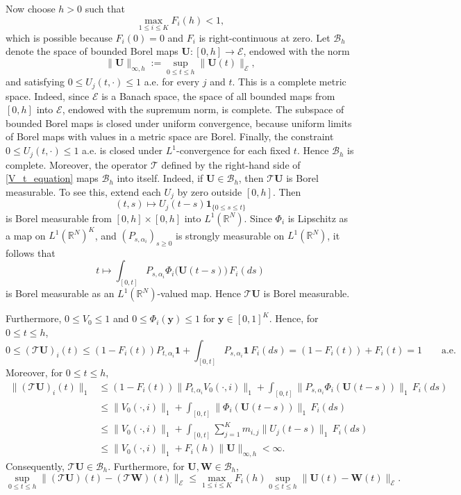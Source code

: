 \documentclass[reqno,final,11pt]{amsart}
\newcommand{\1}{\mathbbm{1}}
\theoremstyle{plain}
\theoremstyle{definition}
\theoremstyle{remark}
\begin{document}
Now choose \(h>0\) such that
\[
\max_{1\le i\le K}F_i(h)<1,
\]
which is possible because \(F_i(0)=0\) and \(F_i\) is right-continuous at
zero. Let \(\mathcal B_h\) denote the space of bounded Borel maps
\(\mathbf U:[0,h]\to\mathcal E\), endowed with the norm
\[
\|\mathbf U\|_{\infty,h}
:=
\sup_{0\le t\le h}\|\mathbf U(t)\|_{\mathcal E},
\]
and satisfying \(0\le U_j(t,\cdot)\le1\) a.e. for every \(j\) and \(t\).
This is a complete metric space. Indeed, since \(\mathcal E\) is a Banach
space, the space of all bounded maps from \([0,h]\) into \(\mathcal E\),
endowed with the supremum norm, is complete. The subspace of bounded Borel
maps is closed under uniform convergence, because uniform limits of Borel maps
with values in a metric space are Borel. Finally, the constraint
\(0\le U_j(t,\cdot)\le1\) a.e. is closed under \(L^1\)-convergence for each
fixed \(t\). Hence \(\mathcal B_h\) is complete. Moreover, the operator \(\mathcal T\) defined by the right-hand side of
\eqref{V_t_equation} maps \(\mathcal B_h\) into itself. Indeed, if
\(\mathbf U\in\mathcal B_h\), then \(\mathcal T\mathbf U\) is Borel
measurable. To see this, extend each \(U_j\) by zero outside \([0,h]\). Then
\[
(t,s)\mapsto U_j(t-s)\mathbf 1_{\{0\le s\le t\}}
\]
is Borel measurable from \([0,h]\times[0,h]\) into \(L^1(\mathbb R^N)\).
Since \(\Phi_i\) is Lipschitz as a map on \(L^1(\mathbb R^N)^K\), and
\((P_{s,\alpha_i})_{s\ge0}\) is strongly measurable on \(L^1(\mathbb R^N)\),
it follows that
\[
t\mapsto
\int_{[0,t]}
P_{s,\alpha_i}\Phi_i\bigl(\mathbf U(t-s)\bigr)\,F_i(ds)
\]
is Borel measurable as an \(L^1(\mathbb R^N)\)-valued map. Hence
\(\mathcal T\mathbf U\) is Borel measurable.

Furthermore, \(0\le V_0\le1\) and \(0\le \Phi_i(\mathbf y)\le1\) for
\(\mathbf y\in[0,1]^K\). Hence, for \(0\le t\le h\),
\[
0\le
(\mathcal T\mathbf U)_i(t)
\le
(1-F_i(t))P_{t,\alpha_i}\mathbf 1
+
\int_{[0,t]}P_{s,\alpha_i}\mathbf 1\,F_i(ds)
=
(1-F_i(t))+F_i(t)
=1
\qquad \text{a.e.}
\]
Moreover, for \(0\le t\le h\),
\[
\begin{aligned}
\|(\mathcal T\mathbf U)_i(t)\|_1
&\le
(1-F_i(t))\|P_{t,\alpha_i}V_0(\cdot,i)\|_1
+
\int_{[0,t]}
\|P_{s,\alpha_i}\Phi_i(\mathbf U(t-s))\|_1\,F_i(ds)
\\
&\le
\|V_0(\cdot,i)\|_1
+
\int_{[0,t]}
\|\Phi_i(\mathbf U(t-s))\|_1\,F_i(ds)
\\
&\le
\|V_0(\cdot,i)\|_1
+
\int_{[0,t]}
\sum_{j=1}^K m_{i,j}\|U_j(t-s)\|_1\,F_i(ds)
\\
&\le
\|V_0(\cdot,i)\|_1
+
F_i(h)\|\mathbf U\|_{\infty,h}
<\infty .
\end{aligned}
\]
Consequently, \(\mathcal T\mathbf U\in\mathcal B_h\).
Furthermore, for \(\mathbf U,\mathbf W\in\mathcal B_h\),
\[
\sup_{0\le t\le h}
\|(\mathcal T\mathbf U)(t)-(\mathcal T\mathbf W)(t)\|_{\mathcal E}
\le
\max_{1\le i\le K}F_i(h)
\sup_{0\le t\le h}
\|\mathbf U(t)-\mathbf W(t)\|_{\mathcal E}.
\]
\end{document}
